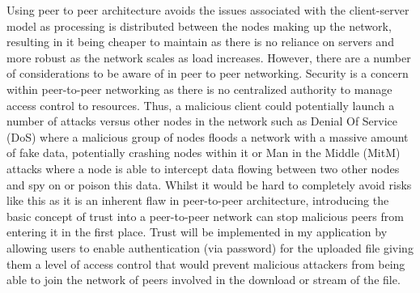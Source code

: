 \documentclass[]{report}
\begin{document}
			Using peer to peer architecture avoids the issues associated with the client-server model as processing is distributed between the nodes making up the network, resulting in it being cheaper to maintain as there is no reliance on servers and more robust as the network scales as load increases. However, there are a number of considerations to be aware of in peer to peer networking. Security is a concern within peer-to-peer networking as there is no centralized authority to manage access control to resources. Thus, a malicious client could potentially launch a number of attacks versus other nodes in the network such as Denial Of Service (DoS) where a malicious group of nodes floods a network with a massive amount of fake data, potentially crashing nodes within it or Man in the Middle (MitM) attacks where a node is able to intercept data flowing between two other nodes and spy on or poison this data\cite{P2P Security Issues}.	Whilst it would be hard to completely avoid risks like this as it is an inherent flaw in peer-to-peer architecture, introducing the basic concept of trust into a peer-to-peer network can stop malicious peers from entering it in the first place. Trust will be implemented in my application by allowing users to enable authentication (via password) for the uploaded file giving them a level of access control that would prevent malicious attackers from being able to join the network of peers involved in the download or stream of the file. 
			
\end{document}
